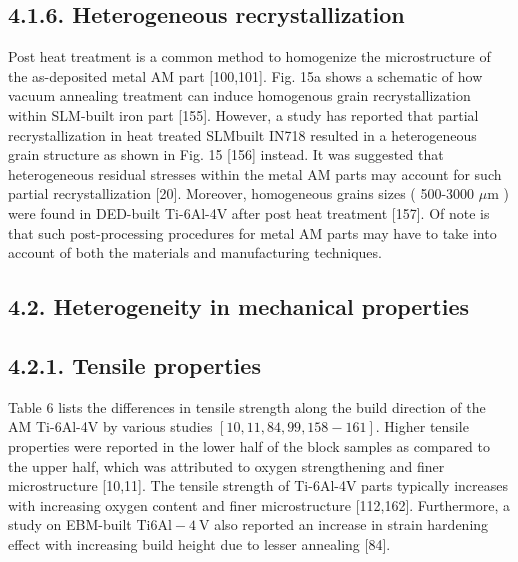 \documentclass[10pt]{article}
\begin{document}
\subsection*{4.1.6. Heterogeneous recrystallization}
Post heat treatment is a common method to homogenize the microstructure of the as-deposited metal AM part [100,101]. Fig. 15a shows a schematic of how vacuum annealing treatment can induce homogenous grain recrystallization within SLM-built iron part [155]. However, a study has reported that partial recrystallization in heat treated SLMbuilt IN718 resulted in a heterogeneous grain structure as shown in Fig. 15 [156] instead. It was suggested that heterogeneous residual stresses within the metal AM parts may account for such partial recrystallization [20]. Moreover, homogeneous grains sizes ( 500-3000 $\mu \mathrm{m}$ ) were found in DED-built Ti-6Al-4V after post heat treatment [157]. Of note is that such post-processing procedures for metal AM parts may have to take into account of both the materials and manufacturing techniques.

\subsection*{4.2. Heterogeneity in mechanical properties}
\subsection*{4.2.1. Tensile properties}
Table 6 lists the differences in tensile strength along the build direction of the AM Ti-6Al-4V by various studies $[10,11,84,99,158-161]$. Higher tensile properties were reported in the lower half of the block samples as compared to the upper half, which was attributed to oxygen strengthening and finer microstructure [10,11]. The tensile strength of Ti-6Al-4V parts typically increases with increasing oxygen content and finer microstructure [112,162]. Furthermore, a study on EBM-built Ti$6 \mathrm{Al}-4 \mathrm{~V}$ also reported an increase in strain hardening effect with increasing build height due to lesser annealing [84].
\end{document}
